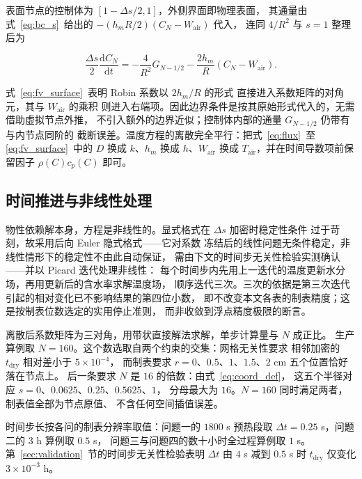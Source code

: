 表面节点的控制体为 $[1-\Delta s/2,1]$，外侧界面即物理表面，
其通量由式~\eqref{eq:bc_s}~给出的 $-(h_mR/2)(C_N-W_{\mathrm{air}})$ 代入，
连同 $4/R^2$ 与 $s=1$ 整理后为

\begin{equation}
\frac{\Delta s}{2}\frac{\mathrm{d}C_N}{\mathrm{d}t}
=-\frac{4}{R^{2}}G_{N-1/2}-\frac{2h_m}{R}\left(C_N-W_{\mathrm{air}}\right).
\label{eq:fv_surface}
\end{equation}

式~\eqref{eq:fv_surface}~表明 Robin 系数以 $2h_m/R$ 的形式
直接进入系数矩阵的对角元，其与 $W_{\mathrm{air}}$ 的乘积
则进入右端项。因此边界条件是按其原始形式代入的，无需借助虚拟节点外推，
不引入额外的边界近似；控制体内部的通量 $G_{N-1/2}$ 仍带有与内节点同阶的
截断误差。温度方程的离散完全平行：把式~\eqref{eq:flux}~至
\eqref{eq:fv_surface}~中的 $D$ 换成 $k$、$h_m$ 换成 $h$、$W_{\mathrm{air}}$
换成 $T_{\mathrm{air}}$，并在时间导数项前保留因子 $\rho(C)c_p(C)$ 即可。

\fi
\subsection{时间推进与非线性处理}

物性依赖解本身，方程是非线性的。显式格式在 $\Delta s$ 加密时稳定性条件
过于苛刻，故采用后向 Euler 隐式格式——它对系数
冻结后的线性问题无条件稳定，非线性情形下的稳定性不由此自动保证，
需由下文的时间步无关性检验实测确认——并以 Picard 迭代处理非线性：
每个时间步内先用上一迭代的温度更新水分场，再用更新后的含水率求解温度场，
顺序迭代三次。三次的依据是第三次迭代引起的相对变化已不影响结果的第四位小数，
即不改变本文各表的制表精度；这是按制表位数选定的实用停止准则，
而非收敛到浮点精度极限的断言。

离散后系数矩阵为三对角，用带状直接解法求解，单步计算量与 $N$ 成正比。
生产算例取 $N=160$。这个数选取自两个约束的交集：网格无关性要求
相邻加密的 $t_{\mathrm{dry}}$ 相对差小于 $5\times10^{-4}$，
而制表要求 $r=0$、$0.5$、$1$、$1.5$、$2$ cm 五个位置恰好落在节点上。
后一条要求 $N$ 是 $16$ 的倍数：由式~\eqref{eq:coord_def}，
这五个半径对应 $s=0$、$0.0625$、$0.25$、$0.5625$、$1$，
分母最大为 $16$。$N=160$ 同时满足两者，制表值全部为节点原值、
不含任何空间插值误差。

时间步长按各问的制表分辨率取值：问题一的 $1800$ s 预热段取
$\Delta t=0.25$ s，问题二的 $3$ h 算例取 $0.5$ s，
问题三与问题四的数十小时全过程算例取 $1$ s。
第~\ref{sec:validation}~节的时间步无关性检验表明 $\Delta t$ 由 $4$ s
减到 $0.5$ s 时 $t_{\mathrm{dry}}$ 仅变化 $3\times10^{-3}$ h。

